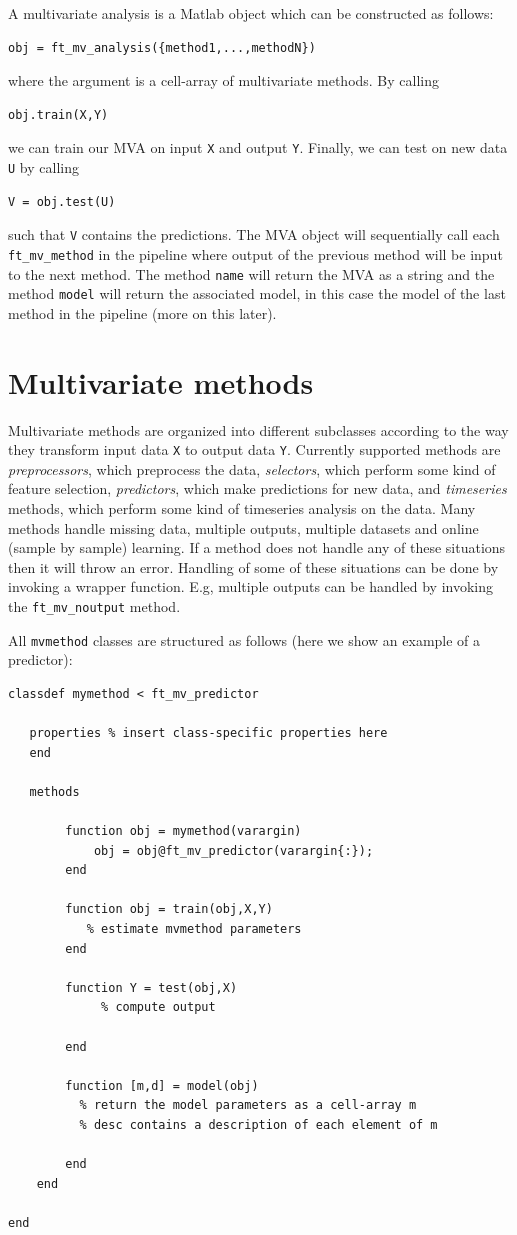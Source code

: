 \documentclass{article}
\renewcommand{\t}[1]{{\tt #1}}
\begin{document}
A multivariate analysis is a Matlab object which can be constructed as follows:
\begin{verbatim}
obj = ft_mv_analysis({method1,...,methodN})
\end{verbatim}
where the argument is a cell-array of multivariate methods. By calling
\begin{verbatim}
obj.train(X,Y)
\end{verbatim}
we can train our MVA on input \t{X} and output \t{Y}. Finally, we can test on new data \t{U} by calling
\begin{verbatim}
V = obj.test(U)
\end{verbatim}
such that \t{V} contains the predictions. The MVA object will sequentially call each \t{ft\_mv\_method} in the pipeline where output of the previous method will be input to the next method. The method \t{name} will return the MVA as a string and the method \t{model} will return the associated model, in this case the model of the last method in the pipeline (more on this later).


\section{Multivariate methods}

Multivariate methods are organized into different subclasses according to the way they transform input data \t{X} to output data \t{Y}. Currently supported methods are {\em preprocessors}, which preprocess the data, {\em selectors}, which perform some kind of feature selection, {\em predictors}, which make predictions for new data, and {\em timeseries} methods, which perform some kind of timeseries analysis on the data. Many methods handle missing data, multiple outputs, multiple datasets and online (sample by sample) learning. If a method does not handle any of these situations then it will throw an error. Handling of some of these situations can be done by invoking a wrapper function. E.g, multiple outputs can be handled by invoking the \t{ft\_mv\_noutput} method.

All \t{mvmethod} classes are structured as follows (here we show an example of a predictor):
\begin{verbatim}
classdef mymethod < ft_mv_predictor
 
   properties % insert class-specific properties here
   end
 
   methods
 
        function obj = mymethod(varargin)       
         	obj = obj@ft_mv_predictor(varargin{:});
        end        
 
        function obj = train(obj,X,Y)
           % estimate mvmethod parameters
        end
 
        function Y = test(obj,X)
        	 % compute output
     
        end
 
        function [m,d] = model(obj)
          % return the model parameters as a cell-array m
          % desc contains a description of each element of m
 
        end
    end
 
end
\end{verbatim}
\end{document}

